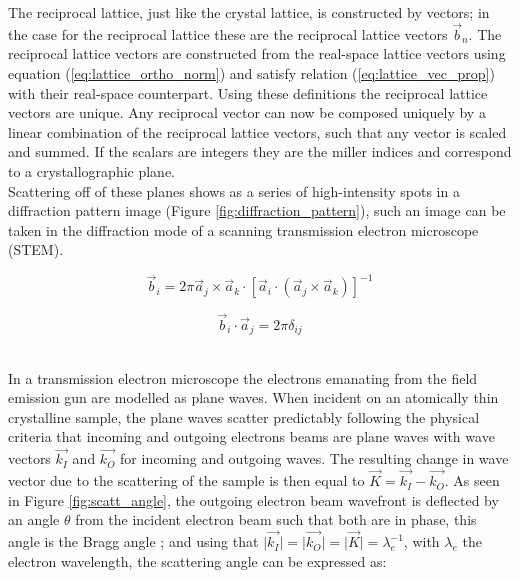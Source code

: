 The reciprocal lattice, just like the crystal lattice, is constructed by vectors; in the case for the reciprocal lattice these are the reciprocal lattice vectors $\vec{b}_n$.
The reciprocal lattice vectors are constructed from the real-space lattice vectors using equation (\ref{eq:lattice_ortho_norm}) and satisfy relation (\ref{eq:lattice_vec_prop}) with their real-space counterpart.
Using these definitions the reciprocal lattice vectors are unique.
Any reciprocal vector can now be composed uniquely by a linear combination of the reciprocal lattice vectors, such that any vector is scaled and summed. If the scalars are integers they are the miller indices and correspond to a crystallographic plane. \\
Scattering off of these planes shows as a series of high-intensity spots in a diffraction pattern image (Figure \ref{fig:diffraction_pattern}), such an image can be taken in the diffraction mode of a scanning transmission electron microscope (STEM). \\

\begin{minipage}{0.5\textwidth}
    \begin{equation}
        \vec{b}_i = 2 \pi \vec{a}_j \times \vec{a}_k \cdot \left[ \vec{a}_i \cdot ( \vec{a}_j \times \vec{a}_k ) \right]^{-1} 
        \label{eq:lattice_ortho_norm}
    \end{equation}
\end{minipage}%
\begin{minipage}{0.5\textwidth}
    \begin{equation}
        \vec{b}_i \cdot \vec{a}_j = 2\pi \delta_{ij}
        \label{eq:lattice_vec_prop}
    \end{equation}
\end{minipage}\\

In a transmission electron microscope the electrons emanating from the field emission gun are modelled as plane waves. When incident on an atomically thin crystalline sample, the plane waves scatter predictably following the physical criteria that incoming and outgoing electrons beams are plane waves with wave vectors $\vec{k_I}$ and $\vec{k_O}$ for incoming and outgoing waves. The resulting change in wave vector due to the scattering of the sample is then equal to $\vec{K} = \vec{k_I}-\vec{k_O}$. As seen in Figure \ref{fig:scatt_angle}, the outgoing electron beam wavefront is deflected by an angle $\theta$ from the incident electron beam such that both are in phase, this angle is the Bragg angle \cite{Williams2009-ww}; and using that $\vert \vec{k_I} \vert = \vert \vec{k_O} \vert = \vert \vec{K} \vert =\lambda_e^{-1}$, with $\lambda_e$ the electron wavelength, the scattering angle can be expressed as:

